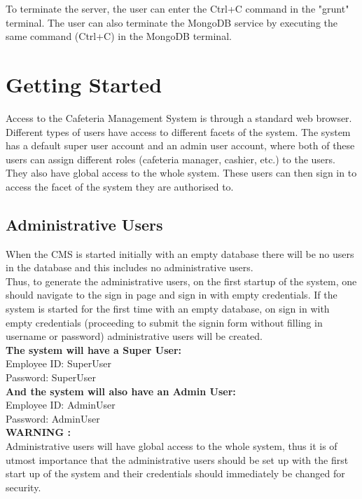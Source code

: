 \documentclass[a4paper,12pt]{report}
\begin{document}
To terminate the server, the user can enter the Ctrl+C command in the "grunt" terminal. The user can also terminate the MongoDB service by executing the same command (Ctrl+C) in the MongoDB terminal.

\section{Getting Started}
Access to the Cafeteria Management System is through a standard web browser. Different types of users have access to different facets of the system. The system has a default super user account and an admin user account, where both of these users can assign different roles (cafeteria manager, cashier, etc.) to the users. They also have global access to the whole system. These users can then sign in to access the facet of the system they are authorised to.\\

\subsection{Administrative Users}
When the CMS is started initially with an empty database there will be no users in the database and this includes no administrative users.  \\
Thus, to generate the administrative users, on the first startup of the system, one should navigate to the sign in page and sign in with empty credentials. If the system is started for the first time with an empty database, on sign in with empty credentials (proceeding to submit the signin form without filling in username or password) administrative users will be created. \\

\textbf{The system will have a Super User:} \\
Employee ID: SuperUser \\
Password: SuperUser \\

\textbf{And the system will also have an Admin User:} \\
Employee ID: AdminUser \\
Password: AdminUser \\

\textbf{WARNING :} \\
Administrative users will have global access to the whole system, thus it is of utmost importance that the administrative users should be set up with the first start up of the system and their credentials should immediately be changed for security. \\ 
\end{document}
